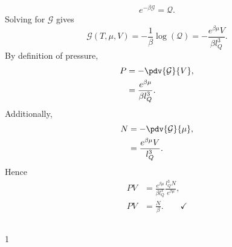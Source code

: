 \documentclass[a4paper,12pt,twoside]{article}
\newcommand{\mcols}{0}
\begin{document}
\begin{multicols*}{2}
\subsubsection{}
\begin{equation}
	e^{-\beta \mathcal{G}} = \mathcal{Q}.
\end{equation}
Solving for $\mathcal{G}$ gives
\begin{equation}
	\mathcal{G}(T,\mu,V) = -\frac{1}{\beta} \log(\mathcal{Q}) = -\frac{e^{\beta \mu}V}{\beta l_Q^3}.
\end{equation}
By definition of pressure,
\begin{align}
	P &= -\pdv{\mathcal{G}}{V},\\
	&= \frac{e^{\beta \mu}}{\beta l_Q^3}.
\end{align}
Additionally,
\begin{align}
	N &= - \pdv{\mathcal{G}}{\mu},\\
	&= \frac{e^{\beta \mu}V}{l_Q^3}.
\end{align}
Hence
\begin{align}
	PV &= \frac{e^{\beta \mu}}{\beta l_Q^3}\frac{l_Q^3 N}{e^{\beta \mu}},\\
	PV &= \frac{N}{\beta}. \qquad\checkmark
\end{align}
\subsubsection{}
\subsection{}%
\subsubsection{}
\subsubsection{}
\subsubsection{}
\subsection{}%
\subsubsection{}
\subsubsection{}
\subsubsection{}


\printBib


\if\mcols1
\end{multicols*}
\fi
\end{document}
